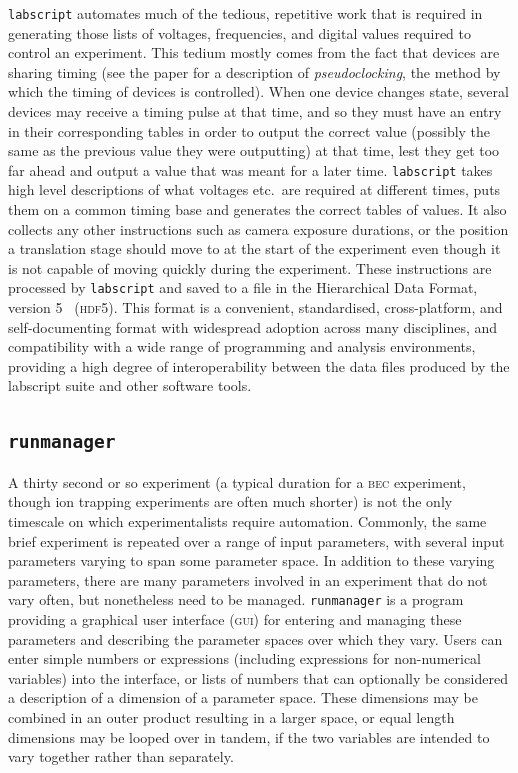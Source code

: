 \texttt{labscript} automates much of the tedious, repetitive work that is required in generating those lists of voltages, frequencies, and digital values required to control an experiment. This tedium mostly comes from the fact that devices are sharing timing (see the paper for a description of \emph{pseudoclocking}, the method by which the timing of devices is controlled). When one device changes state, several devices may receive a timing pulse at that time, and so they must have an entry in their corresponding tables in order to output the correct value (possibly the same as the previous value they were outputting) at that time, lest they get too far ahead and output a value that was meant for a later time. \texttt{labscript} takes high level descriptions of what voltages etc.~are required at different times, puts them on a common timing base and generates the correct tables of values. It also collects any other instructions such as camera exposure durations, or the position a translation stage should move to at the start of the experiment even though it is not capable of moving quickly during the experiment. These instructions are processed by \texttt{labscript} and saved to a file in the Hierarchical Data Format, version 5~\cite{the_hdf_group_hierarchical_1997} (\textsc{hdf5}). This format is a convenient, standardised, cross-platform, and self-documenting format with widespread adoption across many disciplines, and compatibility with a wide range of programming and analysis environments, providing a high degree of interoperability between the data files produced by the labscript suite and other software tools.

\subsection{\texttt{runmanager}}

A thirty second or so experiment (a typical duration for a \textsc{bec} experiment, though ion trapping experiments are often much shorter) is not the only timescale on which experimentalists require automation. Commonly, the same brief experiment is repeated over a range of input parameters, with several input parameters varying to span some parameter space. In addition to these varying parameters, there are many parameters involved in an experiment that do not vary often, but nonetheless need to be managed. \texttt{runmanager} is a program providing a graphical user interface (\textsc{gui}) for entering and managing these parameters and describing the parameter spaces over which they vary. Users can enter simple numbers or expressions (including expressions for non-numerical variables) into the interface, or lists of numbers that can optionally be considered a description of a dimension of a parameter space. These dimensions may be combined in an outer product resulting in a larger space, or equal length dimensions may be looped over in tandem, if the two variables are intended to vary together rather than separately.

